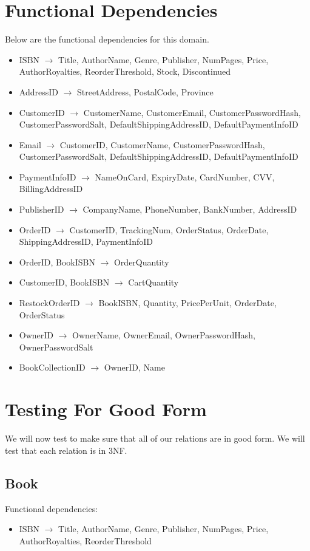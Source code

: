 \documentclass{article}
\newcommand{\trightarrow}{\(\rightarrow\)}
\begin{document}
\section{Functional Dependencies}
Below are the functional dependencies for this domain.
\begin{itemize}
  \item ISBN \trightarrow{} Title, AuthorName, Genre, Publisher, NumPages, Price, AuthorRoyalties, ReorderThreshold, Stock, Discontinued
  \item AddressID \trightarrow{} StreetAddress, PostalCode, Province
  \item CustomerID \trightarrow{} CustomerName, CustomerEmail, CustomerPasswordHash, CustomerPasswordSalt, DefaultShippingAddressID, DefaultPaymentInfoID
  \item Email \trightarrow{} CustomerID, CustomerName, CustomerPasswordHash, CustomerPasswordSalt, DefaultShippingAddressID, DefaultPaymentInfoID
  \item PaymentInfoID \trightarrow{} NameOnCard, ExpiryDate, CardNumber, CVV, BillingAddressID
  \item PublisherID \trightarrow{} CompanyName, PhoneNumber, BankNumber, AddressID
  \item OrderID \trightarrow{} CustomerID, TrackingNum, OrderStatus, OrderDate, ShippingAddressID, PaymentInfoID
  \item OrderID, BookISBN \trightarrow{} OrderQuantity
  \item CustomerID, BookISBN \trightarrow{} CartQuantity
  \item RestockOrderID \trightarrow{} BookISBN, Quantity, PricePerUnit, OrderDate, OrderStatus
  \item OwnerID \trightarrow{} OwnerName, OwnerEmail, OwnerPasswordHash, OwnerPasswordSalt
  \item BookCollectionID \trightarrow{} OwnerID, Name
\end{itemize}

\section{Testing For Good Form}
We will now test to make sure that all of our relations are in good form. We will test that each relation is in 3NF.
\subsection{Book}
Functional dependencies:
\begin{itemize}
  \item ISBN \trightarrow{} Title, AuthorName, Genre, Publisher, NumPages, Price, AuthorRoyalties, ReorderThreshold
\end{itemize}
\end{document}
